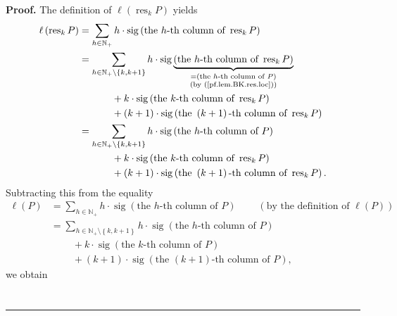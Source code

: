 \documentclass[numbers=enddot,12pt,final,onecolumn,notitlepage]{scrartcl}%
\theoremstyle{definition}
\newenvironment{proof}[1][Proof]{\noindent\textbf{#1.} }{\ \rule{0.5em}{0.5em}}
\newenvironment{verlong}{}{}
\let\sumnonlimits\sum
\renewcommand{\sum}{\sumnonlimits\limits}
\begin{document}
\begin{verlong}
\begin{proof}
The definition of $\ell\left(  \operatorname*{res}\nolimits_{k}P\right)  $
yields%
\begin{align*}
\ell\left(  \operatorname*{res}\nolimits_{k}P\right)   &  =\sum_{h\in
\mathbb{N}_{+}}h\cdot\operatorname*{sig}\left(  \text{the }h\text{-th column
of }\operatorname*{res}\nolimits_{k}P\right) \\
&  =\sum_{h\in\mathbb{N}_{+}\setminus\left\{  k,k+1\right\}  }h\cdot
\operatorname*{sig}\underbrace{\left(  \text{the }h\text{-th column of
}\operatorname*{res}\nolimits_{k}P\right)  }_{\substack{=\left(  \text{the
}h\text{-th column of }P\right)  \\\text{(by (\ref{pf.lem.BK.res.loc}))}}}\\
&  \ \ \ \ \ \ \ \ \ \ +k\cdot\operatorname*{sig}\left(  \text{the }k\text{-th
column of }\operatorname*{res}\nolimits_{k}P\right) \\
&  \ \ \ \ \ \ \ \ \ \ +\left(  k+1\right)  \cdot\operatorname*{sig}\left(
\text{the }\left(  k+1\right)  \text{-th column of }\operatorname*{res}%
\nolimits_{k}P\right) \\
&  =\sum_{h\in\mathbb{N}_{+}\setminus\left\{  k,k+1\right\}  }h\cdot
\operatorname*{sig}\left(  \text{the }h\text{-th column of }P\right) \\
&  \ \ \ \ \ \ \ \ \ \ +k\cdot\operatorname*{sig}\left(  \text{the }k\text{-th
column of }\operatorname*{res}\nolimits_{k}P\right) \\
&  \ \ \ \ \ \ \ \ \ \ +\left(  k+1\right)  \cdot\operatorname*{sig}\left(
\text{the }\left(  k+1\right)  \text{-th column of }\operatorname*{res}%
\nolimits_{k}P\right)  .
\end{align*}
Subtracting this from the equality%
\begin{align*}
\ell\left(  P\right)   &  =\sum_{h\in\mathbb{N}_{+}}h\cdot\operatorname*{sig}%
\left(  \text{the }h\text{-th column of }P\right)  \ \ \ \ \ \ \ \ \ \ \left(
\text{by the definition of }\ell\left(  P\right)  \right) \\
&  =\sum_{h\in\mathbb{N}_{+}\setminus\left\{  k,k+1\right\}  }h\cdot
\operatorname*{sig}\left(  \text{the }h\text{-th column of }P\right) \\
&  \ \ \ \ \ \ \ \ \ \ +k\cdot\operatorname*{sig}\left(  \text{the }k\text{-th
column of }P\right) \\
&  \ \ \ \ \ \ \ \ \ \ +\left(  k+1\right)  \cdot\operatorname*{sig}\left(
\text{the }\left(  k+1\right)  \text{-th column of }P\right)  ,
\end{align*}
we obtain%
\begin{align}

\end{align}
\end{proof}
\end{verlong}
\end{document}
